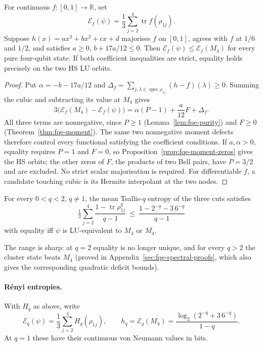 \begin{proposition}\label{prop:fqe-majorant}
For continuous $f:[0,1]\to\mathbb R$, set
\[
\mathcal E_f(\psi)=\frac13\sum_{j=2}^4\operatorname{tr}f(\rho_{1j}).
\]
Suppose $h(x)=ax^3+bx^2+cx+d$ majorises $f$ on $[0,1]$, agrees with $f$
at $1/6$ and $1/2$, and satisfies $a\ge0$, $b+17a/12\le0$.
Then $\mathcal E_f(\psi)\le\mathcal E_f(M_4)$ for every pure four-qubit state.
If both coefficient inequalities are strict, equality holds precisely on the two HS LU orbits.
\end{proposition}
\begin{proof}
Put $\alpha=-b-17a/12$ and
$\Delta_f=\sum_{j,\lambda\in\operatorname{spec}\rho_{1j}}(h-f)(\lambda)\ge0$.
Summing the cubic and subtracting its value at $M_4$ gives
\[
3\bigl(\mathcal E_f(M_4)-\mathcal E_f(\psi)\bigr)
=\alpha(P-1)+\frac a{12}F+\Delta_f.\tag{SF}\label{eq:fqe-spectral}
\]
All three terms are nonnegative, since $P\ge1$ (Lemma~\ref{lem:fqe-purity}) and $F\ge0$
(Theorem~\ref{thm:fqe-moment}). The same two nonnegative moment defects therefore control every functional
satisfying the coefficient conditions. If $a,\alpha>0$, equality requires $P=1$ and $F=0$,
so Proposition~\ref{prop:fqe-moment-zeros} gives the HS orbits; the other zeros of $F$, the products of two Bell pairs,
have $P=3/2$ and are excluded. No strict scalar
majorisation is required. For differentiable $f$, a candidate touching cubic
is its Hermite interpolant at the two nodes.
\end{proof}

\begin{corollary}\label{cor:fqe-tsallis} For every \(0<q<2\), \(q\ne1\), the mean
Tsallis-\(q\) entropy of the three cuts satisfies \[
\boxed{\quad
\tfrac13\sum_{j=2}^4\frac{1-\operatorname{tr}\rho_{1j}^q}{q-1}
\ \le\ \frac{1-2^{-q}-3\,6^{-q}}{q-1}\quad}
\] with equality iff \(\psi\) is LU-equivalent to \(M_4\) or \(\overline{M_4}\). \end{corollary}
The range is sharp: at \(q=2\) equality is no longer unique, and for every \(q>2\) the cluster state beats \(M_4\)
(proved in Appendix~\ref{sec:fqe-spectral-proofs}, which also gives the corresponding quadratic deficit bounds).

\paragraph{R\'enyi entropies.} With $H_q$ as above, write
\[
\mathcal E_q(\psi)=\frac13\sum_{j=2}^4H_q(\rho_{1j}),\qquad
h_q=\mathcal E_q(M_4)=\frac{\log_2(2^{-q}+3\,6^{-q})}{1-q}.
\]
At $q=1$ these have their continuous von Neumann values in bits.

